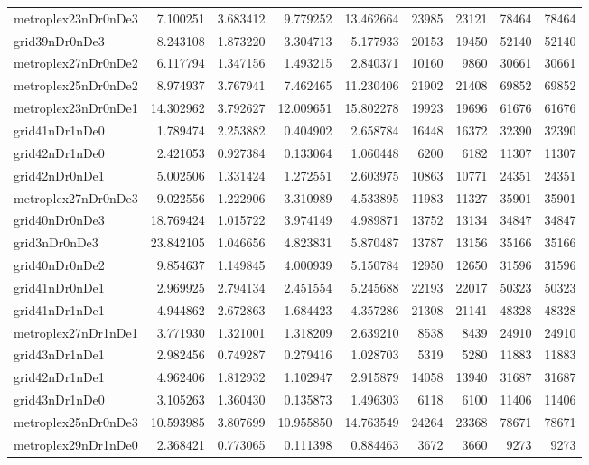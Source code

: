 \begin{longtable}{|l|r|r|r|r|r|r|r|r|}
metroplex23nDr0nDe3 & 7.100251 & 3.683412 & 9.779252 & 13.462664 & 23985 & 23121 & 78464 & 78464 \\
grid39nDr0nDe3 & 8.243108 & 1.873220 & 3.304713 & 5.177933 & 20153 & 19450 & 52140 & 52140 \\
metroplex27nDr0nDe2 & 6.117794 & 1.347156 & 1.493215 & 2.840371 & 10160 & 9860 & 30661 & 30661 \\
metroplex25nDr0nDe2 & 8.974937 & 3.767941 & 7.462465 & 11.230406 & 21902 & 21408 & 69852 & 69852 \\
metroplex23nDr0nDe1 & 14.302962 & 3.792627 & 12.009651 & 15.802278 & 19923 & 19696 & 61676 & 61676 \\
grid41nDr1nDe0 & 1.789474 & 2.253882 & 0.404902 & 2.658784 & 16448 & 16372 & 32390 & 32390 \\
grid42nDr1nDe0 & 2.421053 & 0.927384 & 0.133064 & 1.060448 & 6200 & 6182 & 11307 & 11307 \\
grid42nDr0nDe1 & 5.002506 & 1.331424 & 1.272551 & 2.603975 & 10863 & 10771 & 24351 & 24351 \\
metroplex27nDr0nDe3 & 9.022556 & 1.222906 & 3.310989 & 4.533895 & 11983 & 11327 & 35901 & 35901 \\
grid40nDr0nDe3 & 18.769424 & 1.015722 & 3.974149 & 4.989871 & 13752 & 13134 & 34847 & 34847 \\
grid3nDr0nDe3 & 23.842105 & 1.046656 & 4.823831 & 5.870487 & 13787 & 13156 & 35166 & 35166 \\
grid40nDr0nDe2 & 9.854637 & 1.149845 & 4.000939 & 5.150784 & 12950 & 12650 & 31596 & 31596 \\
grid41nDr0nDe1 & 2.969925 & 2.794134 & 2.451554 & 5.245688 & 22193 & 22017 & 50323 & 50323 \\
grid41nDr1nDe1 & 4.944862 & 2.672863 & 1.684423 & 4.357286 & 21308 & 21141 & 48328 & 48328 \\
metroplex27nDr1nDe1 & 3.771930 & 1.321001 & 1.318209 & 2.639210 & 8538 & 8439 & 24910 & 24910 \\
grid43nDr1nDe1 & 2.982456 & 0.749287 & 0.279416 & 1.028703 & 5319 & 5280 & 11883 & 11883 \\
grid42nDr1nDe1 & 4.962406 & 1.812932 & 1.102947 & 2.915879 & 14058 & 13940 & 31687 & 31687 \\
grid43nDr1nDe0 & 3.105263 & 1.360430 & 0.135873 & 1.496303 & 6118 & 6100 & 11406 & 11406 \\
metroplex25nDr0nDe3 & 10.593985 & 3.807699 & 10.955850 & 14.763549 & 24264 & 23368 & 78671 & 78671 \\
metroplex29nDr1nDe0 & 2.368421 & 0.773065 & 0.111398 & 0.884463 & 3672 & 3660 & 9273 & 9273 \\

\end{longtable}
